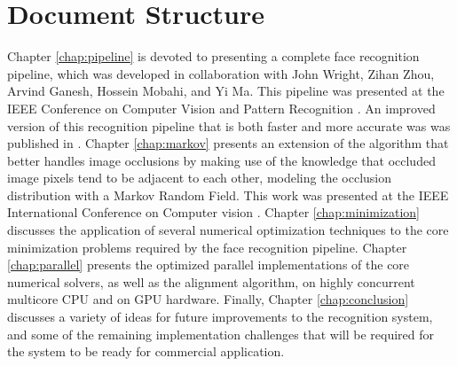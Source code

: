 \section{Document Structure}
%
Chapter \ref{chap:pipeline} is devoted to presenting a complete face
recognition pipeline, which was developed in collaboration with John Wright,
Zihan Zhou, Arvind Ganesh, Hossein Mobahi, and Yi Ma.  This pipeline was
presented at the IEEE Conference on Computer Vision and Pattern Recognition
\cite{WagnerA2009-CVPR}.  An improved version of this recognition pipeline that
is both faster and more accurate was was published in \cite{WagnerA2011-PAMI}.
%
Chapter \ref{chap:markov} presents an extension of the algorithm that better
handles image occlusions by making use of the knowledge that occluded image
pixels tend to be adjacent to each other, modeling the occlusion distribution
with a Markov Random Field.  This work was presented at the IEEE International
Conference on Computer vision \cite{ZhouZ2009}.
%
Chapter \ref{chap:minimization} discusses the application of several numerical
optimization techniques to the core minimization problems required by the face
recognition pipeline.
%
Chapter \ref{chap:parallel} presents the optimized parallel implementations of
the core numerical solvers, as well as the alignment algorithm, on highly
concurrent multicore CPU and on GPU hardware.
%
Finally, Chapter \ref{chap:conclusion} discusses a variety of ideas for future
improvements to the recognition system, and some of the remaining
implementation challenges that will be required for the system to be ready for
commercial application.
 
